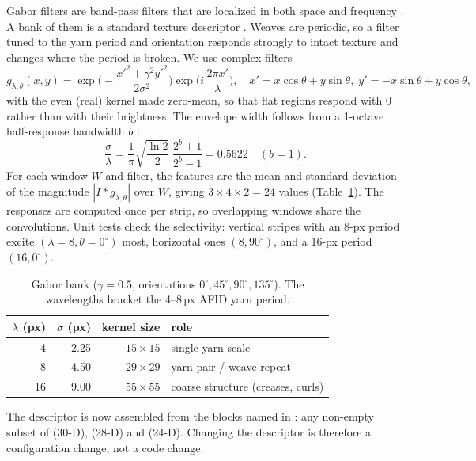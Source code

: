 \documentclass[11pt,a4paper]{article}
\newcommand{\code}[1]{\texttt{\detokenize{#1}}}
\begin{document}
Gabor filters are band-pass filters that are localized in both space and frequency \cite{daugman1985}. A bank of them is a standard texture descriptor \cite{jain1991}. Weaves are periodic, so a filter tuned to the yarn period and orientation responds strongly to intact texture and changes where the period is broken. We use complex filters
\begin{equation}
g_{\lambda,\theta}(x,y)=\exp\!\Big(-\frac{x'^2+\gamma^2y'^2}{2\sigma^2}\Big)\exp\!\Big(i\,\frac{2\pi x'}{\lambda}\Big),\quad
x'=x\cos\theta+y\sin\theta,\; y'=-x\sin\theta+y\cos\theta,
\label{eq:gabor}
\end{equation}
with the even (real) kernel made zero-mean, so that flat regions respond with 0 rather than with their brightness. The envelope width follows from a 1-octave half-response bandwidth $b$ \cite{daugman1985}:
\begin{equation}
\frac{\sigma}{\lambda}=\frac{1}{\pi}\sqrt{\frac{\ln 2}{2}}\;\frac{2^{b}+1}{2^{b}-1}=0.5622\quad(b=1).
\label{eq:bw}
\end{equation}
For each window $W$ and filter, the features are the mean and standard deviation of the magnitude $|I*g_{\lambda,\theta}|$ over $W$, giving $3\times4\times2=24$ values (Table~\ref{tab:gabor}). The responses are computed once per strip, so overlapping windows share the convolutions. Unit tests check the selectivity: vertical stripes with an 8-px period excite $(\lambda{=}8,\theta{=}0^\circ)$ most, horizontal ones $(8,90^\circ)$, and a 16-px period $(16,0^\circ)$.

\begin{table}[h]
\centering
\caption{Gabor bank ($\gamma=0.5$, orientations $0^\circ,45^\circ,90^\circ,135^\circ$). The wavelengths bracket the 4--8\,px AFID yarn period.}
\label{tab:gabor}
\small
\begin{tabular}{@{}rrrl@{}}
\toprule
$\lambda$ (px) & $\sigma$ (px) & kernel size & role \\
\midrule
4 & 2.25 & $15\times15$ & single-yarn scale \\
8 & 4.50 & $29\times29$ & yarn-pair / weave repeat \\
16 & 9.00 & $55\times55$ & coarse structure (creases, curls) \\
\bottomrule
\end{tabular}
\end{table}

The descriptor is now assembled from the blocks named in \code{features.use}: any non-empty subset of \code{glcm} (30-D), \code{lbp} (28-D) and \code{gabor} (24-D). Changing the descriptor is therefore a configuration change, not a code change.
\end{document}
